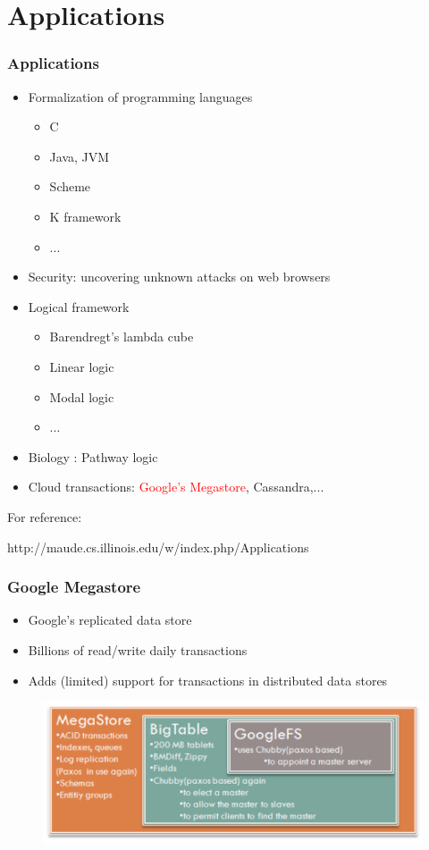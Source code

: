 \documentclass{beamer}
\begin{document}
\section{Applications}
\begin{frame}
    \frametitle{Applications}
    \begin{itemize}
        \item Formalization of programming languages 
        \begin{itemize}
            \item C
            \item Java, JVM
            \item Scheme
            \item K framework
            \item ...
        \end{itemize}
        \item Security: uncovering unknown attacks on web browsers 
        \item Logical framework 
        \begin{itemize}
            \item Barendregt's lambda cube 
            \item Linear logic 
            \item Modal logic
            \item ...
        \end{itemize}
        \item Biology : Pathway logic 
        \item Cloud transactions: \textcolor{red}{Google's Megastore}, Cassandra,...
    \end{itemize}

    For reference:

    http://maude.cs.illinois.edu/w/index.php/Applications
\end{frame}
\begin{frame}
    \frametitle{Google Megastore}
    \begin{itemize}
        \item Google's replicated data store 
        \item Billions  of read/write daily transactions 
        \item Adds (limited) support for transactions  in distributed data stores   
    \end{itemize}
    \begin{figure}
        \includegraphics[width=\textwidth]{img/megastore.png}
    \end{figure}
\end{frame}
\end{document}
